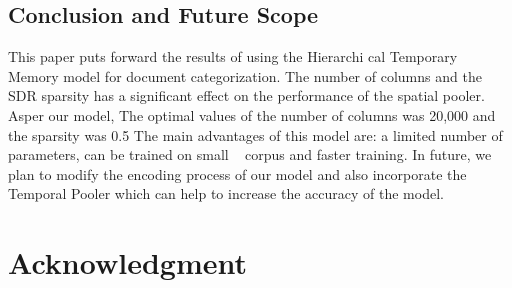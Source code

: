 \documentclass[12pt]{article}
\begin{document}
\begin{multicols}{2}
\subsection{Conclusion and Future Scope}
This paper puts forward the results of using the Hierarchi cal Temporary Memory model for document categorization. The number of columns and the SDR sparsity has a significant effect on the performance of the spatial pooler. Asper our model, The optimal values of the number of columns was 20,000 and the sparsity was 0.5%
The main advantages of this model are: a limited number of parameters, can be trained on small ~\cite{8} corpus and faster training.
In future, we plan to modify the encoding process of our model and also incorporate the Temporal Pooler which can help to increase the accuracy of the model.
\section*{Acknowledgment}




\end{multicols}
\end{document}
